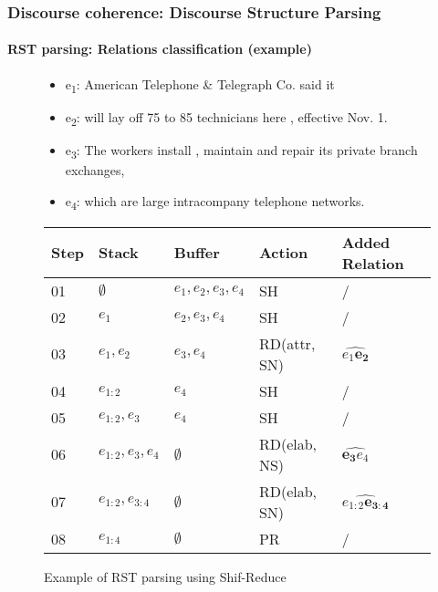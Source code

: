 \documentclass[xcolor=table]{beamer}
\begin{document}
\begin{frame}
	\frametitle{Discourse coherence: Discourse Structure Parsing}
	\framesubtitle{RST parsing: Relations classification (example)}
	
	\begin{figure}
		\begin{minipage}{0.25\textwidth}
		\end{minipage}
		\begin{minipage}{0.70\textwidth}
			\scriptsize
			\begin{itemize}
				\item e\textsubscript{1}: American Telephone \& Telegraph Co. said it
				\item e\textsubscript{2}: will lay off 75 to 85 technicians here , effective Nov. 1.
				\item e\textsubscript{3}: The workers install , maintain and repair its private branch exchanges,
				\item e\textsubscript{4}: which are large intracompany telephone networks.
			\end{itemize}
		\end{minipage}
		
		\small
		\begin{tabular}{lllll}
			\hline\hline 
			Step & Stack & Buffer & Action & Added Relation \\
			\hline
			01 & $\emptyset$ & $e_1, e_2, e_3, e_4$ & SH & / \\
			02 & $e_1$ & $e_2, e_3, e_4$ & SH & / \\
			03 & $e_1, e_2$ & $e_3, e_4$ & RD(attr, SN) & $\widehat{e_1 \mathbf{e_2}}$ \\
			04 & $e_{1:2}$ & $e_4$ & SH & / \\
			05 & $e_{1:2}, e_3$ & $e_4$ & SH & / \\
			06 & $e_{1:2}, e_3, e_4$ & $\emptyset$ & RD(elab, NS) & $\widehat{\mathbf{e_3} e_4}$ \\
			07 & $e_{1:2}, e_{3:4}$ & $\emptyset$ & RD(elab, SN) & $\widehat{e_{1:2}\mathbf{e_{3:4}}}$ \\
			08 & $e_{1:4}$ & $\emptyset$ & PR & / \\
			\hline\hline
		\end{tabular}
		\caption{Example of RST parsing using Shif-Reduce \cite{2018-yu-al}}
	\end{figure}
	
\end{frame}
\end{document}
